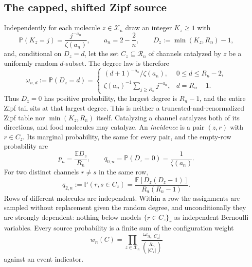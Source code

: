 \documentclass[11pt,letterpaper]{article}
\theoremstyle{plain}
\theoremstyle{definition}
\theoremstyle{remark}
\numberwithin{equation}{section}
\newcommand{\PP}{\mathbb P}
\newcommand{\EE}{\mathbb E}
\newcommand{\XX}{\mathcal X}
\newcommand{\RR}{\mathcal R}
\begin{document}
\subsection{The capped, shifted Zipf source}\label{sec:source}
Independently for each molecule $z\in\XX_n$ draw an integer $K_z\ge1$ with
\begin{equation}\label{eq:zipf}
 \PP(K_z=j)=\frac{j^{-a_n}}{\zeta(a_n)},\qquad a_n=2-\frac2n,
 \qquad D_z:=\min(K_z,R_n)-1 ,
\end{equation}
and, conditional on $D_z=d$, let the set $C_z\subseteq\RR_n$ of channels catalyzed by $z$ be a uniformly random $d$-subset. The degree law is therefore
\begin{equation}\label{eq:degreelaw}
 \omega_{n,d}:=\PP(D_z=d)=
 \begin{cases}(d+1)^{-a_n}/\zeta(a_n),&0\le d\le R_n-2,\\[3pt]
 \zeta(a_n)^{-1}\sum_{j\ge R_n}j^{-a_n},&d=R_n-1 .\end{cases}
\end{equation}
Thus $D_z=0$ has positive probability, the largest degree is $R_n-1$, and the entire Zipf tail sits at that largest degree. This is neither a truncated-and-renormalized Zipf table nor $\min(K_z,R_n)$ itself. Catalyzing a channel catalyzes both of its directions, and food molecules may catalyze. An \emph{incidence} is a pair $(z,r)$ with $r\in C_z$. Its marginal probability, the same for every pair, and the empty-row probability are
\begin{equation}\label{eq:marginal}
 p_n=\frac{\EE D_z}{R_n},\qquad q_{0,n}=\PP(D_z=0)=\frac1{\zeta(a_n)} .
\end{equation}
For two distinct channels $r\ne s$ in the same row,
\begin{equation}\label{eq:pair}
 q_{2,n}:=\PP(r,s\in C_z)=\frac{\EE[D_z(D_z-1)]}{R_n(R_n-1)} .
\end{equation}
Rows of different molecules are independent. Within a row the assignments are sampled without replacement given the random degree, and unconditionally they are strongly dependent: nothing below models $\{r\in C_z\}_r$ as independent Bernoulli variables. Every source probability is a finite sum of the configuration weight
\begin{equation}\label{eq:weight}
 w_n(C)=\prod_{z\in\XX_n}\frac{\omega_{n,|C_z|}}{\binom{R_n}{|C_z|}}
\end{equation}
against an event indicator.
\end{document}
